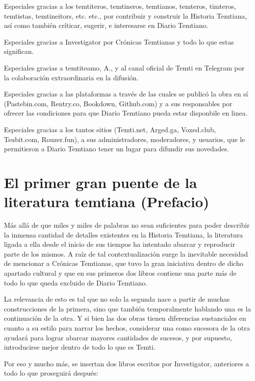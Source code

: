 \documentclass[
  spanish,
]{book}
\begin{document}
Especiales gracias a los temtiteros, temtineros, temtianos, temteros, timteros, temtistas, temtineitors, etc. etc., por contribuir y construir la Historia Temtiana, así como también críticar, sugerir, e interesarse en Diario Temtiano.

Especiales gracias a Investigator por Crónicas Temtianas y todo lo que estas significan.

Especiales gracias a temtiteamo, A., y al canal oficial de Temti en Telegram por la colaboración extraordinaria en la difusión.

Especiales gracias a las plataformas a través de las cuales se publicó la obra en sí (Pastebin.com, Rentry.co, Bookdown, Github.com) y a sus responsables por ofrecer las condiciones para que Diario Temtiano pueda estar disponbile en linea.

Especiales gracias a los tantos sitios (Temti.net, Arged.ga, Voxed.club, Tsubit.com, Rouzer.fun), a sus administradores, moderadores, y usuarios, que le permitieron a Diario Temtiano tener un lugar para difundir sus novedades.

\hypertarget{el-primer-gran-puente-de-la-literatura-temtiana-prefacio}{%
\chapter{El primer gran puente de la literatura temtiana (Prefacio)}\label{el-primer-gran-puente-de-la-literatura-temtiana-prefacio}}

Más allá de que miles y miles de palabras no sean suficientes para poder describir la inmensa cantidad de detalles existentes en la Historia Temtiana, la literatura ligada a ella desde el inicio de sus tiempos ha intentado abarcar y reproducir parte de los mismos. A raíz de tal contextualización surge la inevitable necesidad de mencionar a Crónicas Temtianas, que tuvo la gran iniciativa dentro de dicho apartado cultural y que en sus primeros dos libros contiene una parte más de todo lo que queda excluido de Diario Temtiano.

La relevancia de esto es tal que no solo la segunda nace a partir de muchas construcciones de la primera, sino que también temporalmente hablando una es la continuación de la otra. Y si bien las dos obras tienen diferencias sustanciales en cuanto a su estilo para narrar los hechos, considerar una como sucesora de la otra ayudará para lograr abarcar mayores cantidades de sucesos, y por supuesto, introducirse mejor dentro de todo lo que es Temti.

Por eso y mucho más, se insertan dos libros escritos por Investigator, anteriores a todo lo que proseguirá después:
\end{document}
